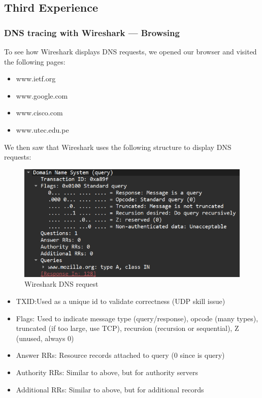 \subsection{Third Experience}

\subsubsection{DNS tracing with Wireshark --- Browsing}
To see how Wireshark displays DNS requests, we opened our browser and visited
the following pages:

\begin{itemize}
    \item www.ietf.org
    \item www.google.com
    \item www.cisco.com
    \item www.utec.edu.pe
\end{itemize}

We then saw that Wireshark uses the following structure to display DNS
requests:

\begin{figure}[htbp]
    \centering
    \includegraphics[width=1\linewidth]{img/13.png}
    \caption{Wireshark DNS request}\label{fig:13}
\end{figure}

\begin{itemize}
    \item TXID:\@ Used as a unique id to validate correctness (UDP skill issue)
    \item Flags: Used to indicate message type (query/response), opcode (many types),
          truncated (if too large, use TCP), recursion (recursion or sequential), Z
          (unused, always 0)
    \item Answer RRs: Resource records attached to query (0 since is query)
    \item Authority RRs: Similar to above, but for authority servers
    \item Additional RRs: Similar to above, but for additional records
\end{itemize}

